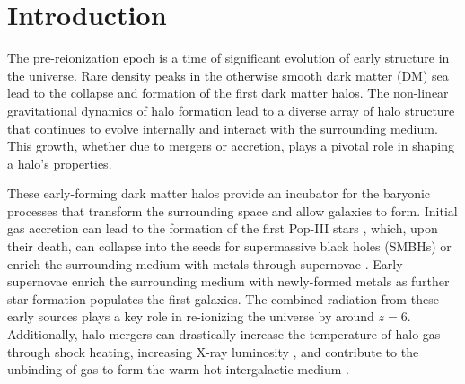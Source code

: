 
%
%

\section{Introduction}
\label{sec:introduction}








The pre-reionization epoch is a time of significant evolution of early structure in the universe.  Rare density peaks in the otherwise smooth dark matter (DM) sea lead to the collapse and formation of the first dark matter halos.  The non-linear gravitational dynamics of halo formation lead to a diverse array of halo structure that continues to evolve internally and interact with the surrounding medium.  This growth, whether due to mergers or accretion, plays a pivotal role in shaping a halo's properties.

These early-forming dark matter halos provide an incubator for the baryonic processes that transform the surrounding space and allow galaxies to form.  Initial gas accretion can lead to the formation of the first Pop-III stars \citep{1986MNRAS.221...53C, 1997ApJ...474....1T}, which, upon their death, can collapse into the seeds for supermassive black holes (SMBHs) \citep{2001ApJ...551L..27M, 2003ApJ...582..559V, 2003MNRAS.340..647I, 2009ApJ...696.1798T, 2009ApJ...701L.133A, 2012ApJ...754...34J, 2011MNRAS.414.1127M} or enrich the surrounding medium with metals through supernovae \citep{2003ApJ...591..288H}.  Early supernovae enrich the surrounding medium with newly-formed metals as further star formation populates the first galaxies.  The combined radiation from these early sources plays a key role in re-ionizing the universe by around $z = 6$.  Additionally, halo mergers can drastically increase the temperature of halo gas through shock heating, increasing X-ray luminosity \citep{2009MNRAS.397..190S}, and contribute to the unbinding of gas to form the warm-hot intergalactic medium \citep{2010MNRAS.405L..31S}.


